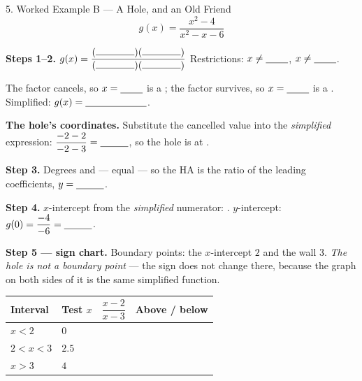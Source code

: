 \documentclass[10pt]{article}
\begin{document}
\begin{notesbox}{5. Worked Example B --- A Hole, and an Old Friend}
\[ g(x)=\frac{x^2-4}{x^2-x-6} \]

\textbf{Steps 1--2.} \quad $g(x)=\dfrac{(\rule{1.4cm}{0.4pt})(\rule{1.4cm}{0.4pt})}%
{(\rule{1.4cm}{0.4pt})(\rule{1.4cm}{0.4pt})}$ \quad Restrictions: $x\neq\blank{0.8cm}$,
$x\neq\blank{0.8cm}$.

\vspace{3pt}
The factor \blank{1.4cm} cancels, so $x=\blank{0.8cm}$ is a \blank{1.2cm}; the factor
\blank{1.4cm} survives, so $x=\blank{0.8cm}$ is a \blank{2.6cm}. Simplified:
$g(x)=\blank{2.2cm}$.

\vspace{3pt}
\textbf{The hole's coordinates.} Substitute the cancelled value into the \emph{simplified} expression:
$\dfrac{-2-2}{-2-3}=\blank{1.0cm}$, so the hole is at \blank{1.8cm}.

\vspace{3pt}
\textbf{Step 3.} Degrees \blank{0.7cm} and \blank{0.7cm} --- equal --- so the HA is the ratio of the
leading coefficients, $y=\blank{1.0cm}$.

\vspace{3pt}
\textbf{Step 4.} $x$-intercept from the \emph{simplified} numerator: \blank{1.4cm}. \;
$y$-intercept: $g(0)=\dfrac{-4}{-6}=\blank{1.0cm}$.

\vspace{4pt}
\begin{center}
\end{center}

\vspace{4pt}
\textbf{Step 5 --- sign chart.} Boundary points: the $x$-intercept $2$ and the wall $3$. \emph{The hole
is not a boundary point} --- the sign does not change there, because the graph on both sides of it is
the same simplified function.
\begin{center}
\renewcommand{\arraystretch}{1.5}
\begin{tabularx}{0.94\linewidth}{|C{2.6cm}|C{1.6cm}|C{2.6cm}|X|}
\hline
{}
\textbf{Interval} & \textbf{Test $x$} & \textbf{$\dfrac{x-2}{x-3}$} & \textbf{Above / below} \\ \hline
$x<2$     & $0$   & & \\ \hline
$2<x<3$   & $2.5$ & & \\ \hline
$x>3$     & $4$   & & \\ \hline
\end{tabularx}
\end{center}


\end{notesbox}
\end{document}
